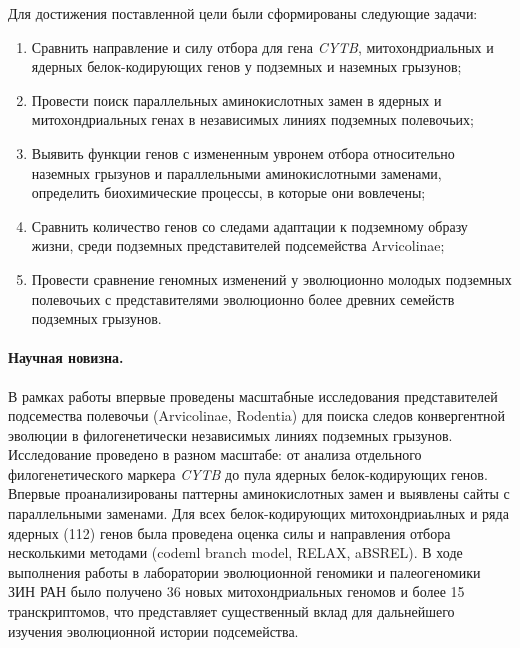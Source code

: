 Для достижения поставленной цели были сформированы следующие задачи:
\begin{enumerate}
	\item Сравнить направление и силу отбора для гена \textit{CYTB}, митохондриальных и ядерных белок-кодирующих генов у подземных и наземных грызунов;
	\item Провести поиск параллельных аминокислотных замен в ядерных и митохондриальных генах в независимых линиях подземных полевочьих;
	\item Выявить функции генов с измененным увронем отбора относительно наземных грызунов и параллельными аминокислотными заменами, определить биохимические процессы, в которые они вовлечены;
	\item Сравнить количество генов со следами адаптации к подземному образу жизни, среди подземных представителей подсемейства Arvicolinae;
	\item Провести сравнение геномных изменений у эволюционно молодых подземных полевочьих с представителями эволюционно более древних семейств подземных грызунов. 
\end{enumerate}

\paragraph{Научная новизна.} В рамках работы впервые проведены масштабные исследования представителей подсемества полевочьи (Arvicolinae, Rodentia) для поиска следов конвергентной эволюции в филогенетически независимых линиях подземных грызунов. Исследование проведено в разном масштабе: от анализа отдельного филогенетического маркера \textit{CYTB} до пула ядерных белок-кодирующих генов. Впервые проанализированы паттерны аминокислотных замен и выявлены сайты с параллельными заменами. Для всех белок-кодирующих митохондриаьлных и ряда ядерных (112) генов была проведена оценка силы и направления отбора несколькими методами (codeml branch model, RELAX, aBSREL). В ходе выполнения работы в лаборатории эволюционной геномики и палеогеномики ЗИН РАН было получено 36 новых митохондриальных геномов и более 15 транскриптомов, что представляет существенный вклад для дальнейшего изучения эволюционной истории подсемейства. 

